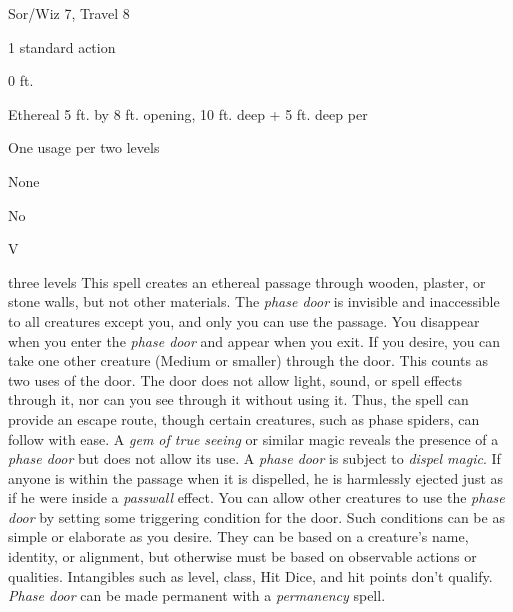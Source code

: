 
\begin{description*}
\item[Level:] Sor/Wiz 7, Travel 8
\item[Casting Time:] 1 standard action
\item[Range:] 0 ft.
\item[Effect:] Ethereal 5 ft. by 8 ft. opening, 10 ft. deep + 5 ft. deep per
\item[Duration:] One usage per two levels
\item[Saving Throw:] None
\item[Spell Resistance:] No
\item[Components:] V
\end{description*}

three levels
This spell creates an ethereal passage through wooden, plaster, or stone walls,
but not other materials. The \textit{phase door} is invisible and inaccessible
to all creatures except you, and only you can use the passage. You disappear when
you enter the \textit{phase door} and appear when you exit. If you desire, you
can take one other creature (Medium or smaller) through the door. This counts as
two uses of the door. The door does not allow light, sound, or spell effects through
it, nor can you see through it without using it. Thus, the spell can provide an
escape route, though certain creatures, such as phase spiders, can follow with
ease. A \textit{gem of true seeing} or similar magic reveals the presence of a
\textit{phase door} but does not allow its use.
A \textit{phase door} is subject to \textit{dispel magic}. If anyone is within
the passage when it is dispelled, he is harmlessly ejected just as if he were inside
a \textit{passwall} effect.
You can allow other creatures to use the \textit{phase door} by setting some triggering
condition for the door. Such conditions can be as simple or elaborate as you desire.
They can be based on a creature's name, identity, or alignment, but otherwise must
be based on observable actions or qualities. Intangibles such as level, class,
Hit Dice, and hit points don't qualify.
\textit{Phase door} can be made permanent with a \textit{permanency} spell.